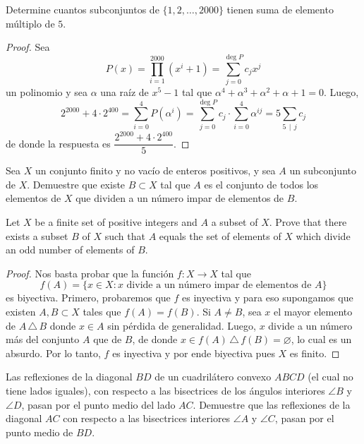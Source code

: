 \begin{probMR}
	Determine cuantos subconjuntos de $\{1,2,\dots,2000\}$ tienen suma de elemento múltiplo de $5$.
\end{probMR}

\begin{proof}
	Sea
	\[P(x)=\prod_{i=1}^{2000}(x^i+1)=\sum_{j=0}^{\deg P}c_jx^j\]
	un polinomio y sea $\alpha$ una raíz de $x^5-1$ tal que $\alpha^4+\alpha^3+\alpha^2+\alpha+1=0$. Luego,
	\[2^{2000}+4\cdot 2^{400}=\sum_{i=0}^4 P(\alpha^i)=\sum_{j=0}^{\deg P}c_j\cdot\sum_{i=0}^4\alpha^{ij}=5\sum_{5\,\mid\,j}c_j\]
	de donde la respuesta es $\dfrac{2^{2000}+4\cdot 2^{400}}{5}$.
\end{proof}

\begin{probEG}[MOSP 1999]
	Sea $X$ un conjunto finito y no vacío de enteros positivos, y sea $A$ un subconjunto de $X$. Demuestre que existe $B\subset X$ tal que $A$ es el conjunto de todos los elementos de $X$ que dividen a un número impar de elementos de $B$.
	\begin{hint}
		Let $X$ be a finite set of positive integers and $A$ a subset of $X$. Prove that there exists a subset $B$ of $X$ such that $A$ equals the set of elements of $X$ which divide an odd number of elements of $B$.
	\end{hint}
\end{probEG}

\begin{proof}
	Nos basta probar que la función $f:X\to X$ tal que
	\[f(A)=\{x\in X:x\text{ divide a un número impar de elementos de }A\}\]
	es biyectiva. Primero, probaremos que $f$ es inyectiva y para eso supongamos que existen $A,B\subset X$ tales que $f(A)=f(B)$. Si $A\ne B$, sea $x$ el mayor elemento de $A\,\triangle\,B$ donde $x\in A$ sin pérdida de generalidad. Luego, $x$ divide a un número más del conjunto $A$ que de $B$, de donde $x\in f(A)\,\triangle\,f(B)=\varnothing$, lo cual es un absurdo. Por lo tanto, $f$ es inyectiva y por ende biyectiva pues $X$ es finito.
\end{proof}


\begin{probEG}
	Las reflexiones de la diagonal $BD$ de un cuadrilátero convexo $ABCD$ (el cual no tiene lados iguales), con respecto a las bisectrices de los ángulos interiores $\angle B$ y $\angle D$, pasan por el punto medio del lado $AC$. Demuestre que las reflexiones de la diagonal $AC$ con respecto a las bisectrices interiores $\angle A$ y $\angle C$, pasan por el punto medio de $BD$.
\end{probEG}

